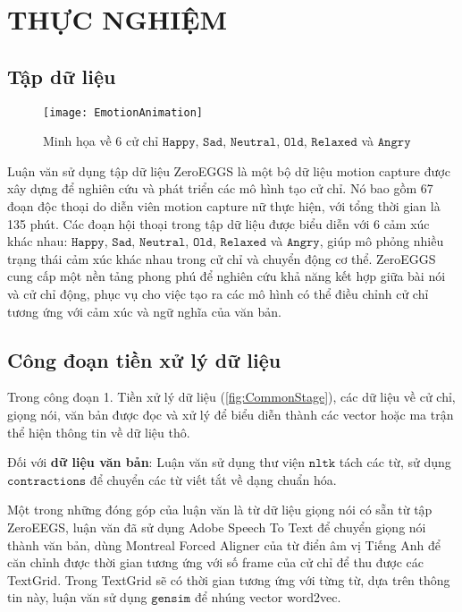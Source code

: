 \chapter{THỰC NGHIỆM}
\label{Chapter4}

\section{Tập dữ liệu}

\begin{figure}[H]
	\centering
	\texttt{[image: EmotionAnimation]}
	\caption{Minh họa về 6 cử chỉ $\texttt{Happy}$, $\texttt{Sad}$, $\texttt{Neutral}$, $\texttt{Old}$, $\texttt{Relaxed}$ và $\texttt{Angry}$}
\end{figure}

Luận văn sử dụng tập dữ liệu ZeroEGGS \cite{ghorbani2022zeroeggszeroshotexamplebasedgesture} là một bộ dữ liệu motion capture được xây dựng để nghiên cứu và phát triển các mô hình tạo cử chỉ. Nó bao gồm 67 đoạn độc thoại do diễn viên motion capture nữ thực hiện, với tổng thời gian là 135 phút. Các đoạn hội thoại trong tập dữ liệu được biểu diễn với 6 cảm xúc khác nhau: $\texttt{Happy}$, $\texttt{Sad}$, $\texttt{Neutral}$, $\texttt{Old}$, $\texttt{Relaxed}$ và $\texttt{Angry}$, giúp mô phỏng nhiều trạng thái cảm xúc khác nhau trong cử chỉ và chuyển động cơ thể. ZeroEGGS cung cấp một nền tảng phong phú để nghiên cứu khả năng kết hợp giữa bài nói và cử chỉ động, phục vụ cho việc tạo ra các mô hình có thể điều chỉnh cử chỉ tương ứng với cảm xúc và ngữ nghĩa của văn bản.

\section{Công đoạn tiền xử lý dữ liệu}
\label{sec:Preprocessing}

Trong công đoạn {1. Tiền xử lý dữ liệu} (\autoref{fig:CommonStage}), các dữ liệu về cử chỉ, giọng nói, văn bản được đọc và xử lý để biểu diễn thành các vector hoặc ma trận thể hiện thông tin về dữ liệu thô.

Đối với \textbf{dữ liệu văn bản}: Luận văn sử dụng thư viện $\texttt{nltk}$ tách các từ, sử dụng $\texttt{contractions}$ để chuyển các từ viết tắt về dạng chuẩn hóa.

Một trong những đóng góp của luận văn là từ dữ liệu giọng nói có sẵn từ tập ZeroEEGS, luận văn đã sử dụng Adobe Speech To Text để chuyển giọng nói thành văn bản, dùng Montreal Forced Aligner \cite{saxon2020robust} của từ điển âm vị Tiếng Anh để căn chỉnh được thời gian tương ứng với số frame của cử chỉ để thu được các TextGrid. Trong TextGrid sẽ có thời gian tương ứng với từng từ, dựa trên thông tin này, luận văn sử dụng  $\texttt{gensim}$ để nhúng vector word2vec.
 

